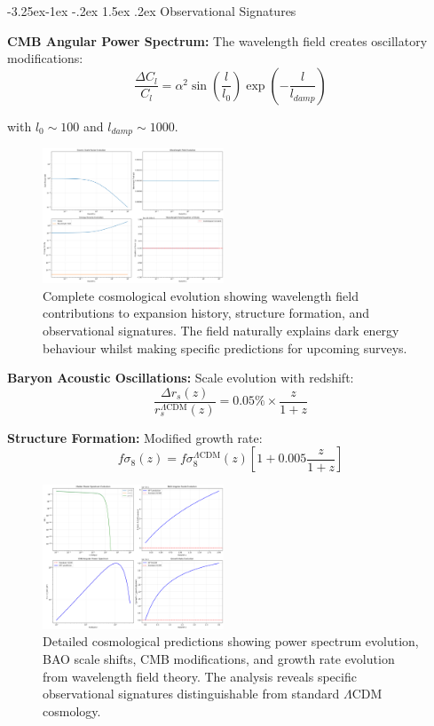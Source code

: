 \documentclass[10pt,twocolumn]{article}
\makeatletter
\renewcommand\subsection{\@startsection{subsection}{2}{\z@}%
  {-3.25ex\@plus -1ex \@minus -.2ex}%
  {1.5ex \@plus .2ex}%
  {\normalfont\normalsize\bfseries}}
\makeatother
\begin{document}
\subsection{Observational Signatures}

\textbf{CMB Angular Power Spectrum:}
The wavelength field creates oscillatory modifications:
\begin{equation}
\frac{\Delta C_l}{C_l} = \alpha^2 \sin\left(\frac{l}{l_0}\right) \exp\left(-\frac{l}{l_{damp}}\right)
\end{equation}

with $l_0 \sim 100$ and $l_{damp} \sim 1000$.

\begin{figure}[h]
\centering
\includegraphics[width=0.48\textwidth]{../figures/complete_cosmological_evolution.png}
\caption{Complete cosmological evolution showing wavelength field contributions to expansion history, structure formation, and observational signatures. The field naturally explains dark energy behaviour whilst making specific predictions for upcoming surveys.}
\label{fig:cosmological_evolution}
\end{figure}

\textbf{Baryon Acoustic Oscillations:}
Scale evolution with redshift:
\begin{equation}
\frac{\Delta r_s(z)}{r_s^{\Lambda\text{CDM}}(z)} = 0.05\% \times \frac{z}{1+z}
\end{equation}

\textbf{Structure Formation:}
Modified growth rate:
\begin{equation}
f\sigma_8(z) = f\sigma_8^{\Lambda\text{CDM}}(z) \left[1 + 0.005 \frac{z}{1+z}\right]
\end{equation}

\begin{figure}[h]
\centering
\includegraphics[width=0.48\textwidth]{../figures/detailed_cosmological_predictions.png}
\caption{Detailed cosmological predictions showing power spectrum evolution, BAO scale shifts, CMB modifications, and growth rate evolution from wavelength field theory. The analysis reveals specific observational signatures distinguishable from standard $\Lambda$CDM cosmology.}
\label{fig:detailed_predictions}
\end{figure}
\end{document}
